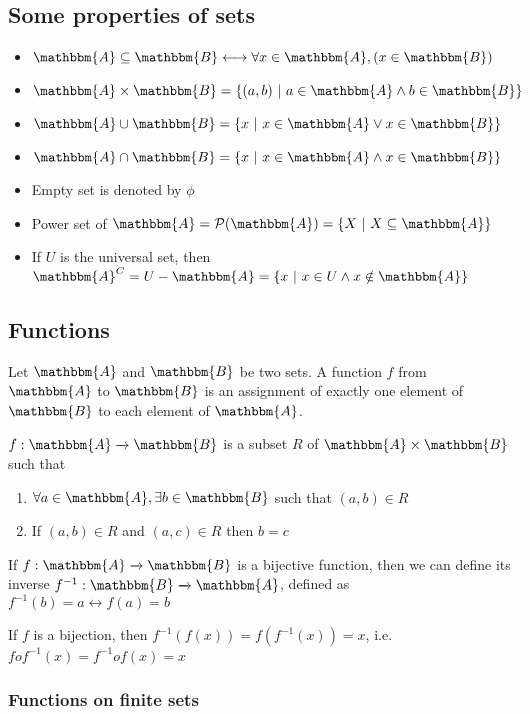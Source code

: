\documentclass[14pt]{extarticle}
\newcommand{\impl}{\xrightarrow{}}
\newcommand{\ifff}{\longleftrightarrow}
\newcommand{\A}{\mathbbm{A}}
\newcommand{\B}{\mathbbm{B}}
\newcommand{\powerset}{\mathcal{P}}
\begin{document}
\subsection{Some properties of sets}

\begin{itemize}
    \item $\A \subseteq \B \ifff \forall x \in \A, (x \in \B)$
    \item $\A \times \B = \{ (a, b) \ | \ a \in \A \land b \in \B \}$
    \item $\A \cup \B = \{ x \ | \ x \in \A \lor x \in \B \}$
    \item $\A \cap \B = \{ x \ | \ x \in \A \land x \in \B \}$
    \item Empty set is denoted by $\phi$
    \item Power set of $\A = \powerset(\A) = \{X \ | \ X \subseteq \A\}$
    \item If $U$ is the universal set, then $\A^C = U - \A = \{ x \ | \ x \in U \land x \notin \A \}$
\end{itemize}

\newpage

\subsection{Functions}

Let $\A$ and $\B$ be two sets. A function $f$ from $\A$ to $\B$ is an assignment of exactly one element of $\B$ to each element of $\A$.

$f : \A \impl \B$ is a subset $R$ of $\A \times \B$ such that

\begin{enumerate}
    \item $\forall a \in \A, \exists b \in \B$ such that $(a, b) \in R$
    \item If $(a, b) \in R$ and $(a, c) \in R$ then $b = c$
\end{enumerate}

If $f : \A \impl \B$ is a bijective function, then we can define its inverse $f^{-1} : \B \impl \A$, defined as $f^{-1}(b) = a \ifff f(a) = b$

If $f$ is a bijection, then $f^{-1}(f(x)) = f(f^{-1}(x)) = x$, i.e. $fof^{-1} (x) = f^{-1}of(x) = x$

\subsubsection{Functions on finite sets}
\end{document}
